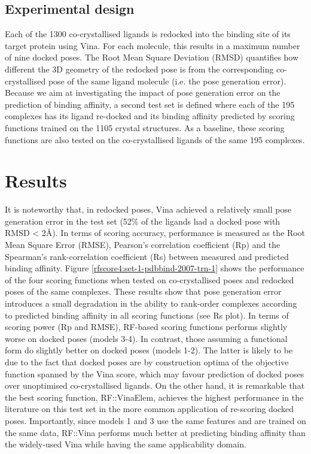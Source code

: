 \subsection{Experimental design}

Each of the 1300 co-crystallised ligands is redocked into the binding site of its target protein using Vina. For each molecule, this results in a maximum number of nine docked poses. The Root Mean Square Deviation (RMSD) quantifies how different the 3D geometry of the redocked pose is from the corresponding co-crystallised pose of the same ligand molecule (i.e. the pose generation error). Because we aim at investigating the impact of pose generation error on the prediction of binding affinity, a second test set is defined where each of the 195 complexes has its ligand re-docked and its binding affinity predicted by scoring functions trained on the 1105 crystal structures. As a baseline, these scoring functions are also tested on the co-crystallised ligands of the same 195 complexes.

\section{Results}

It is noteworthy that, in redocked poses, Vina achieved a relatively small pose generation error in the test set (52\% of the ligands had a docked pose with RMSD < 2\AA). In terms of scoring accuracy, performance is measured as the Root Mean Square Error (RMSE), Pearson’s correlation coefficient (Rp) and the Spearman’s rank-correlation coefficient (Rs) between measured and predicted binding affinity. Figure \ref{rfscore4:set-1-pdbbind-2007-trn-1} shows the performance of the four scoring functions when tested on co-crystallised poses and redocked poses of the same complexes. These results show that pose generation error introduces a small degradation in the ability to rank-order complexes according to predicted binding affinity in all scoring functions (see Rs plot). In terms of scoring power (Rp and RMSE), RF-based scoring functions performs slightly worse on docked poses (models 3-4). In contrast, those assuming a functional form do slightly better on docked poses (models 1-2). The latter is likely to be due to the fact that docked poses are by construction optima of the objective function spanned by the Vina score, which may favour prediction of docked poses over unoptimised co-crystallised ligands. On the other hand, it is remarkable that the best scoring function, RF::VinaElem, achieves the highest performance in the literature on this test set in the more common application of re-scoring docked poses. Importantly, since models 1 and 3 use the same features and are trained on the same data, RF::Vina performs much better at predicting binding affinity than the widely-used Vina while having the same applicability domain.

